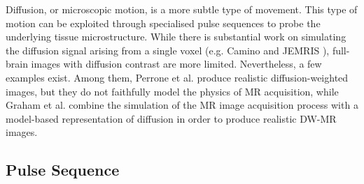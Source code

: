 \hfill

Diffusion, or microscopic motion, is a more subtle type of movement.
This type of motion can be exploited through specialised pulse sequences to probe the underlying tissue microstructure.
While there is substantial work on simulating the diffusion signal arising from a single voxel (e.g. Camino \cite{Cook2006} and JEMRIS \cite{Stocker2010}),
full-brain images with diffusion contrast are more limited.
Nevertheless, a few examples exist.
Among them, Perrone et al. \cite{Perrone2016} produce realistic diffusion-weighted images, but they do not faithfully model the physics of MR acquisition,
while Graham et al. \cite{Graham2016} combine the simulation of the MR image acquisition process with a model-based representation of diffusion in order to produce realistic DW-MR images.
% 
% 

\hfill

\subsection{Pulse Sequence}

